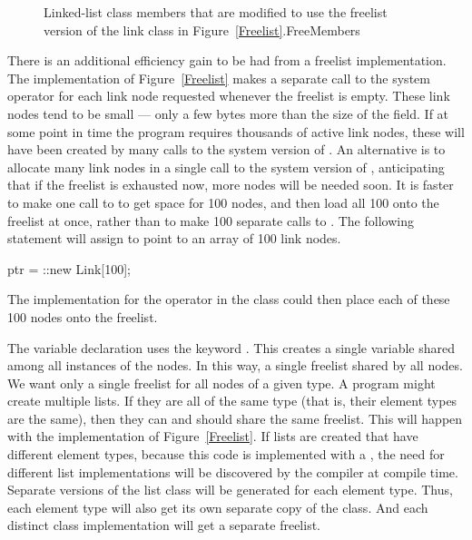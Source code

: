 {\begin{figure}
\vspace{-\medskipamount}
{Linked-list class members that are modified to use the freelist
version of the link class in Figure~\ref{Freelist}.}{FreeMembers}
\vspace{1pt}
\end{figure}}{}

{There is an additional efficiency gain to be had from a freelist
implementation.
The implementation of Figure~\ref{Freelist} makes a separate call to
the system  operator for each link node requested whenever
the freelist is empty.
These link nodes tend to be small --- only a few bytes more than the
size of the  field.
If at some point in time the program requires thousands of active
link nodes, these will have been created by many calls to the system
version of .
An alternative is to allocate many link nodes in a single call to
the system version of , anticipating that if the freelist is
exhausted now, more nodes will be needed soon.
It is faster to make one call to  to get space for 100
 nodes, and then load all 100 onto the freelist at once,
rather than to make 100 separate calls to .
The following statement will assign  to point to an array
of 100 link nodes.

\begin{progenv}
ptr = ::new Link[100];
\end{progenv}

\noindent The implementation for the  operator in the
 class could then place each of these 100 nodes onto the
freelist.
}{}


The  variable declaration uses the keyword
.
This creates a single variable shared among all instances of the
 nodes.
{In this way, a single freelist shared by all  nodes.}{}
{We want only a single freelist for all  nodes of a given
type.
A program might create multiple lists.
If they are all of the same type (that is, their element types are the
same), then they can and should share the same freelist.
This will happen with the implementation of Figure~\ref{Freelist}.
If lists are created that have different element types, because this
code is implemented with a \Gen, the need for different list
implementations will be discovered by
the compiler at compile time.
Separate versions of the list class will be generated for each
element type.
Thus, each element type will also get its own separate copy of the
 class.
And each distinct  class implementation will get a separate
freelist.}{}



